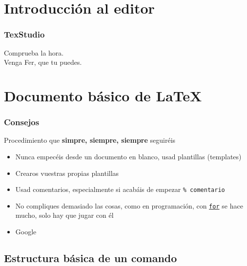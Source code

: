 \documentclass{beamer}
\begin{document}

\section{Introducción al editor}

\begin{frame}
	\frametitle{TexStudio}
	Comprueba la hora. \\
	Venga Fer, que tu puedes.
\end{frame}


\section{Documento básico de \LaTeX}

\begin{frame}[fragile]
	\frametitle{Consejos}
	Procedimiento que \textbf{simpre, siempre, siempre} seguiréis
	\begin{itemize}
		\item Nunca empecéis desde un documento en blanco, usad plantillas (templates)
		\item Crearos vuestras propias plantillas
		\item Usad comentarios, especialmente si acabáis de empezar \verb|% comentario|
		\item No compliques demasiado las cosas, como en programación, con \underline{\texttt{for}} se hace mucho, solo hay que jugar con él
		\item Google
	\end{itemize}
\end{frame}

\subsection{Estructura básica de un comando}
\end{document}
